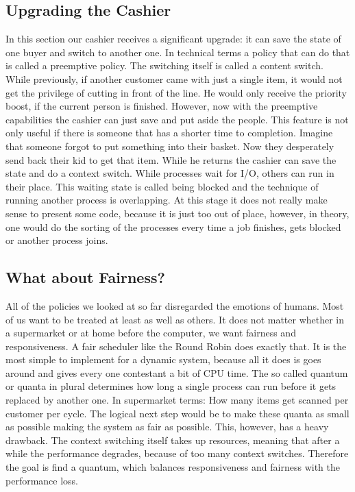 \subsection{Upgrading the Cashier}

In this section our cashier receives a significant upgrade: it can save the state of one buyer and switch to another one.
In technical terms a policy that can do that is called a preemptive policy. 
The switching itself is called a content switch.
While previously, if another customer came with just a single item, it would not get the privilege of cutting in front of the line. 
He would only receive the priority boost, if the current person is finished.
However, now with the preemptive capabilities the cashier can just save and put aside the people.
This feature is not only useful if there is someone that has a shorter time to completion.
Imagine that someone forgot to put something into their basket.
Now they desperately send back their kid to get that item. While he returns the cashier can save the state and do a context switch.
While processes wait for I/O, others can run in their place.
This waiting state is called being blocked and the technique of running another process is overlapping.
At this stage it does not really make sense to present some code, because it is just too out of place, however, in theory, one would do the sorting of the processes every time a job finishes, gets blocked or another process joins.

\subsection{What about Fairness?} \label{sec:rr}

All of the policies we looked at so far disregarded the emotions of humans.
Most of us want to be treated at least as well as others.
It does not matter whether in a supermarket or at home before the computer, we want fairness and responsiveness.
A fair scheduler like the Round Robin does exactly that. 
It is the most simple to implement for a dynamic system, because all it does is goes around and gives every one contestant a bit of CPU time.
The so called quantum or quanta in plural determines how long a single process can run before it gets replaced by another one.
In supermarket terms: How many items get scanned per customer per cycle.
The logical next step would be to make these quanta as small as possible making the system as fair as possible.
This, however, has a heavy drawback.
The context switching itself takes up resources, meaning that after a while the performance degrades, because of too many context switches.
Therefore the goal is find a quantum, which balances responsiveness and fairness with the performance loss.



